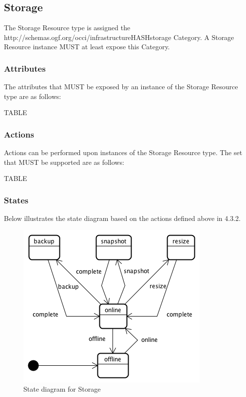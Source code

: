 \documentclass[10pt,a4paper]{article}
\begin{document}
\subsection{Storage}
The Storage Resource type is assigned the http://schemas.ogf.org/occi/infrastructureHASHstorage Category. A Storage Resource instance MUST at least expose this Category.

\subsubsection{Attributes}
The attributes that MUST be exposed by an instance of the Storage Resource type are as follows:

TABLE

\subsubsection{Actions}
Actions can be performed upon instances of the Storage Resource type. The set that MUST be supported are as follows:

TABLE

\subsubsection{States}
Below illustrates the state diagram based on the actions defined above in 4.3.2.

\begin{figure}[!h]
	\centering
	\includegraphics[scale=0.4]{dia/storage-state.png}
	\caption{State diagram for Storage}
	\label{fig:storage_state}
\end{figure}

\end{document}
